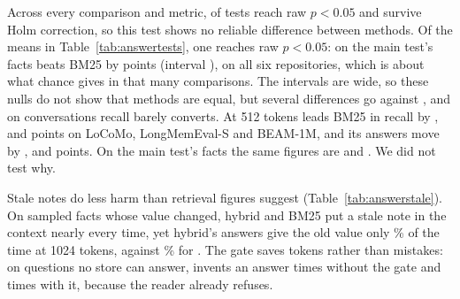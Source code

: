 Across every comparison and metric,  of  tests reach raw $p<0.05$ and  survive Holm correction, so this test shows no reliable difference between methods. Of the  means in Table~\ref{tab:answertests}, one reaches raw $p<0.05$: on the main test's facts \kanerva beats BM25 by  points (interval ), on all six repositories, which is about what chance gives in that many comparisons. The intervals are wide, so these nulls do not show that methods are equal, but several differences go against \kanerva, and on conversations recall barely converts. At 512 tokens \kanerva leads BM25 in recall by ,  and  points on LoCoMo, LongMemEval-S and BEAM-1M, and its answers move by ,  and  points. On the main test's facts the same figures are  and . We did not test why.

Stale notes do less harm than retrieval figures suggest (Table~\ref{tab:answerstale}). On  sampled facts whose value changed, hybrid and BM25 put a stale note in the context nearly every time, yet hybrid's answers give the old value only \% of the time at 1024 tokens, against \% for \kanerva. The gate saves tokens rather than mistakes: on  questions no store can answer, \kanerva invents an answer  times without the gate and  times with it, because the reader already refuses.

\begin{table}[t]\centering\scriptsize
\caption{Share of answers that contain the reference, from the notes a method selected, at 256, 512 and 1024 tokens. ``Labelled evidence'' hands the reader the gold notes alone. With no notes the score is zero.}\label{tab:answers}

\end{table}

\begin{table}[!htb]\centering\scriptsize
\caption{Answers: paired differences of the mean over 256, 512 and 1024 tokens. The unit is a conversation or a repository, and a question on LongMemEval-S, so its positive-unit count is omitted. $p$ is raw.}\label{tab:answertests}
\resizebox{\columnwidth}{!}{}
\end{table}

